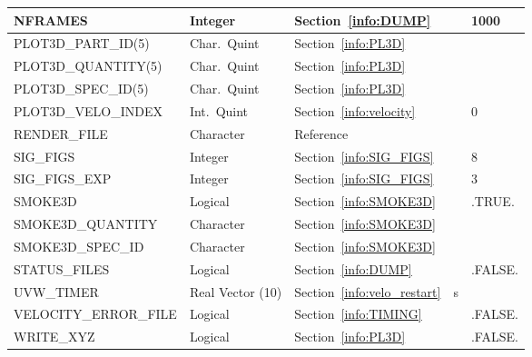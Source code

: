 \documentclass[11pt]{book}
\begin{document}
\begin{longtable}{@{\extracolsep{\fill}}|l|l|l|l|l|}
{\ct NFRAMES}                       & Integer      & Section~\ref{info:DUMP}                &           & 1000                           \\ \hline
{\ct PLOT3D\_PART\_ID(5)}           & Char.~Quint  & Section~\ref{info:PL3D}                &           &                                \\ \hline
{\ct PLOT3D\_QUANTITY(5)}           & Char.~Quint  & Section~\ref{info:PL3D}                &           &                                \\ \hline
{\ct PLOT3D\_SPEC\_ID(5)}           & Char.~Quint  & Section~\ref{info:PL3D}                &           &                                \\ \hline
{\ct PLOT3D\_VELO\_INDEX}           & Int.~Quint   & Section~\ref{info:velocity}            &           &  0                             \\ \hline
{\ct RENDER\_FILE}                  & Character    & Reference~\cite{Smokeview_Users_Guide} &           &                                \\ \hline
{\ct SIG\_FIGS}                     & Integer      & Section~\ref{info:SIG_FIGS}            &           & 8                              \\ \hline
{\ct SIG\_FIGS\_EXP}                & Integer      & Section~\ref{info:SIG_FIGS}            &           & 3                              \\ \hline
{\ct SMOKE3D}                       & Logical      & Section~\ref{info:SMOKE3D}             &           & {\ct .TRUE.}                   \\ \hline
{\ct SMOKE3D\_QUANTITY}             & Character    & Section~\ref{info:SMOKE3D}             &           &                                \\ \hline
{\ct SMOKE3D\_SPEC\_ID}             & Character    & Section~\ref{info:SMOKE3D}             &           &                                \\ \hline
{\ct STATUS\_FILES}                 & Logical      & Section~\ref{info:DUMP}                &           & {\ct .FALSE.}                  \\ \hline
{\ct UVW\_TIMER}                    & Real Vector (10)  & Section~\ref{info:velo_restart}   &  s        &                                \\ \hline
{\ct VELOCITY\_ERROR\_FILE}         & Logical      & Section~\ref{info:TIMING}              &           & {\ct .FALSE.}                  \\ \hline
{\ct WRITE\_XYZ}                    & Logical      & Section~\ref{info:PL3D}                &           & {\ct .FALSE.}                  \\ \hline
\end{longtable}
\end{document}
